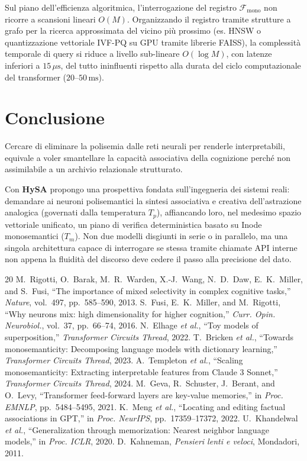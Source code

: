 \documentclass[11pt,a4paper]{article}
\theoremstyle{definition}
\begin{document}
Sul piano dell'efficienza algoritmica, l'interrogazione del registro $\mathcal{F}_{\mathrm{mono}}$ non ricorre a scansioni lineari $O(M)$. Organizzando il registro tramite strutture a grafo per la ricerca approssimata del vicino più prossimo (es. HNSW o quantizzazione vettoriale IVF-PQ su GPU tramite librerie FAISS), la complessità temporale di query si riduce a livello sub-lineare $O(\log M)$, con latenze inferiori a $15\,\mu\text{s}$, del tutto ininfluenti rispetto alla durata del ciclo computazionale del transformer ($20\text{--}50\,\text{ms}$).

\section{Conclusione}

Cercare di eliminare la polisemia dalle reti neurali per renderle interpretabili, equivale a voler smantellare la capacità associativa della cognizione perché non assimilabile a un archivio relazionale strutturato.

Con \textbf{HySA} propongo una prospettiva fondata sull'ingegneria dei sistemi reali: demandare ai neuroni polisemantici la sintesi associativa e creativa dell'astrazione analogica (governati dalla temperatura $T_p$), affiancando loro, nel medesimo spazio vettoriale unificato, un piano di verifica deterministica basato su Inode monosemantici ($T_m$). Non due modelli disgiunti in serie o in parallelo, ma una singola architettura capace di interrogare se stessa tramite chiamate API interne non appena la fluidità del discorso deve cedere il passo alla precisione del dato.

\begin{thebibliography}{20}
\small
{} M.~Rigotti, O.~Barak, M.~R.~Warden, X.-J.~Wang, N.~D.~Daw, E.~K.~Miller, and S.~Fusi, ``The importance of mixed selectivity in complex cognitive tasks,'' \textit{Nature}, vol.~497, pp.~585--590, 2013.
 S.~Fusi, E.~K.~Miller, and M.~Rigotti, ``Why neurons mix: high dimensionality for higher cognition,'' \textit{Curr. Opin. Neurobiol.}, vol.~37, pp.~66--74, 2016.
 N.~Elhage \textit{et al.}, ``Toy models of superposition,'' \textit{Transformer Circuits Thread}, 2022.
 T.~Bricken \textit{et al.}, ``Towards monosemanticity: Decomposing language models with dictionary learning,'' \textit{Transformer Circuits Thread}, 2023.
 A.~Templeton \textit{et al.}, ``Scaling monosemanticity: Extracting interpretable features from Claude 3 Sonnet,'' \textit{Transformer Circuits Thread}, 2024.
 M.~Geva, R.~Schuster, J.~Berant, and O.~Levy, ``Transformer feed-forward layers are key-value memories,'' in \textit{Proc. EMNLP}, pp.~5484--5495, 2021.
 K.~Meng \textit{et al.}, ``Locating and editing factual associations in GPT,'' in \textit{Proc. NeurIPS}, pp.~17359--17372, 2022.
 U.~Khandelwal \textit{et al.}, ``Generalization through memorization: Nearest neighbor language models,'' in \textit{Proc. ICLR}, 2020.
 D.~Kahneman, \textit{Pensieri lenti e veloci}, Mondadori, 2011.
\end{thebibliography}
\end{document}
